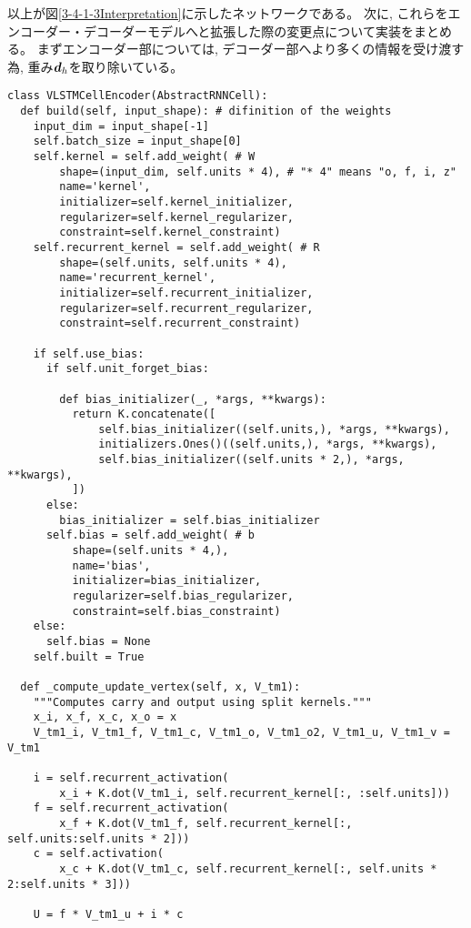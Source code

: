 以上が図\ref{3-4-1-3Interpretation}に示したネットワークである。
次に, これらをエンコーダー・デコーダーモデルへと拡張した際の変更点について実装をまとめる。
まずエンコーダー部については, デコーダー部へより多くの情報を受け渡す為, 重み${\mbox{\boldmath{$d$}}}_h$を取り除いている。

\begin{lstlisting}[caption=エンコーダー部の変更点, label=Encoder]
class VLSTMCellEncoder(AbstractRNNCell):
  def build(self, input_shape): # difinition of the weights
    input_dim = input_shape[-1]
    self.batch_size = input_shape[0]
    self.kernel = self.add_weight( # W
        shape=(input_dim, self.units * 4), # "* 4" means "o, f, i, z"
        name='kernel',
        initializer=self.kernel_initializer,
        regularizer=self.kernel_regularizer,
        constraint=self.kernel_constraint)
    self.recurrent_kernel = self.add_weight( # R
        shape=(self.units, self.units * 4),
        name='recurrent_kernel',
        initializer=self.recurrent_initializer,
        regularizer=self.recurrent_regularizer,
        constraint=self.recurrent_constraint)

    if self.use_bias:
      if self.unit_forget_bias:

        def bias_initializer(_, *args, **kwargs):
          return K.concatenate([
              self.bias_initializer((self.units,), *args, **kwargs),
              initializers.Ones()((self.units,), *args, **kwargs),
              self.bias_initializer((self.units * 2,), *args, **kwargs),
          ])
      else:
        bias_initializer = self.bias_initializer
      self.bias = self.add_weight( # b
          shape=(self.units * 4,),
          name='bias',
          initializer=bias_initializer,
          regularizer=self.bias_regularizer,
          constraint=self.bias_constraint)
    else:
      self.bias = None
    self.built = True

  def _compute_update_vertex(self, x, V_tm1):
    """Computes carry and output using split kernels."""
    x_i, x_f, x_c, x_o = x
    V_tm1_i, V_tm1_f, V_tm1_c, V_tm1_o, V_tm1_o2, V_tm1_u, V_tm1_v = V_tm1

    i = self.recurrent_activation(
        x_i + K.dot(V_tm1_i, self.recurrent_kernel[:, :self.units]))
    f = self.recurrent_activation(
        x_f + K.dot(V_tm1_f, self.recurrent_kernel[:, self.units:self.units * 2]))
    c = self.activation(
        x_c + K.dot(V_tm1_c, self.recurrent_kernel[:, self.units * 2:self.units * 3]))

    U = f * V_tm1_u + i * c


\end{lstlisting}
